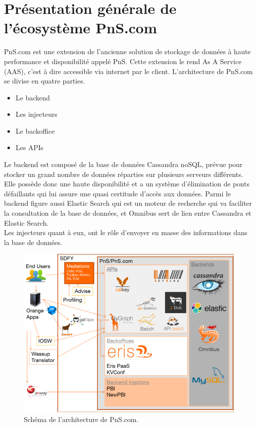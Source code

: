 
\section{Présentation générale de l'écosystème PnS.com}


PnS.com est une extension de l'ancienne solution de stockage de données à haute performance et disponibilité appelé PnS. Cette extension le rend As A Service (AAS), c'est à dire accessible via internet par le client. L'architecture de PnS.com se divise en quatre parties.

\begin{itemize}
    \item Le backend
    \item Les injecteurs
    \item Le backoffice
    \item Les APIs
\end{itemize}




Le backend est composé de la base de données Cassandra noSQL, prévue pour stocker un grand nombre de données réparties sur plusieurs serveurs différents. Elle possède donc une haute disponibilité et a un système d'élimination de ponts défaillants qui lui assure une quasi certitude d'accès aux données. Parmi le backend figure aussi Elastic Search qui est un moteur de recherche qui va faciliter la consultation de la base de données, et Omnibus sert de lien entre Cassandra et Elastic Search.\\

Les injecteurs quant à eux, ont le rôle d'envoyer en masse des informations dans la base de données.\\
\begin{figure}[htp]
  \centering
  \includegraphics[width=15cm]{images/pns/psn.png}
  \caption{Schéma de l'architecture de PnS.com.}
  \label{pns}
\end{figure}


